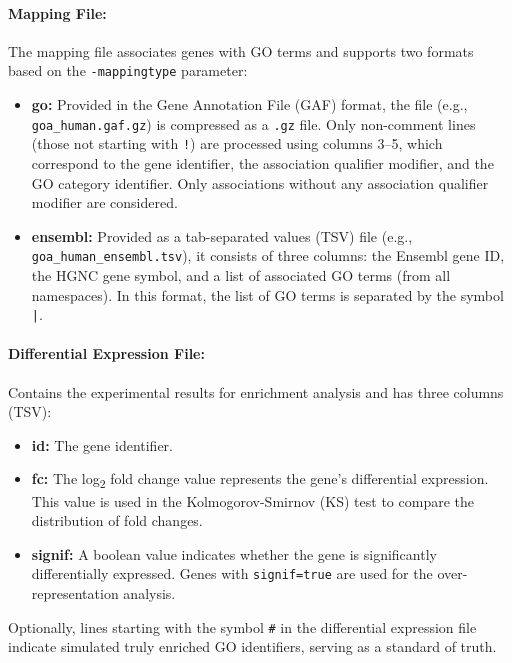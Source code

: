 \documentclass{article}
\begin{document}
    \paragraph{Mapping File:}
    The mapping file associates genes with GO terms and supports two formats based on the \texttt{-mappingtype} parameter:
    \begin{itemize}
        \item \textbf{go:} Provided in the Gene Annotation File (GAF) format, the file (e.g., \texttt{goa\_human.gaf.gz}) is compressed as a \texttt{.gz} file. Only non-comment lines (those not starting with \texttt{!}) are processed using columns 3--5, which correspond to the gene identifier, the association qualifier modifier, and the GO category identifier. Only associations without any association qualifier modifier are considered.
        \item \textbf{ensembl:} Provided as a tab-separated values (TSV) file (e.g., \texttt{goa\_human\_ensembl.tsv}), it consists of three columns: the Ensembl gene ID, the HGNC gene symbol, and a list of associated GO terms (from all namespaces). In this format, the list of GO terms is separated by the symbol \texttt{|}.
    \end{itemize}

    \paragraph{Differential Expression File:}
    Contains the experimental results for enrichment analysis and has three columns (TSV):
    \begin{itemize}
        \item \textbf{id:} The gene identifier.
        \item \textbf{fc:} The log\textsubscript{2} fold change value represents the gene's differential expression. This value is used in the Kolmogorov-Smirnov (KS) test to compare the distribution of fold changes.
        \item \textbf{signif:} A boolean value indicates whether the gene is significantly differentially expressed. Genes with \texttt{signif=true} are used for the over-representation analysis.
    \end{itemize}
    Optionally, lines starting with the symbol \texttt{\#} in the differential expression file indicate simulated truly enriched GO identifiers, serving as a standard of truth.
\end{document}
